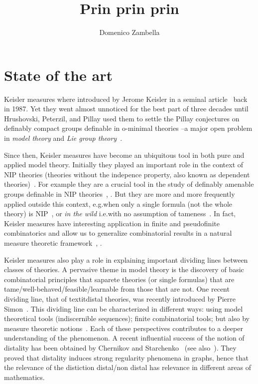\documentclass[10pt]{article}
\title{Prin prin prin}
\author{Domenico Zambella}
\begin{document}
\maketitle
\section{State of the art}
Keisler measures where introduced by Jerome Keisler in a seminal article~\cite{MR890599} back in 1987.
Yet they went almost unnoticed for the best part of three decades until Hrushovski, Peterzil, and Pillay used them to settle the Pillay conjectures on definably compact groups definable in o-minimal theories --a major open problem in \textit{model theory\/} and \textit{Lie group theory\/}~\cite{MR2373360}.

Since then, Keisler measures have become an ubiquitous tool in both pure and applied model theory.
Initially they played an important role in the context of NIP theories (theories without the indepence property, also known as dependent theories)~\cite{MR3560428}.
For example they are a crucial tool in the study of definably amenable groups definable in NIP theories~\cite{MR3787403}, \cite{MR2427062}.
But they are more and more frequently applied outside this context, e.g.\@ when only a single formula (not the whole theory) is NIP~\cite{MR4010500}, \cite{arXiv:2103.09946} or \textit{in the wild\/} i.e.\@ with no assumption of tameness~\cite{arXiv:2103.09946}.
In fact, Keisler measures have interesting application in finite and pseudofinite combinatorics and allow us to generalize combinatorial results in a natural measure theoretic framework~\cite{MR4222408}, \cite{MR3666030}.

Keisler measures also play a role in explaining important dividing lines between classes of theories.
A pervasive theme in model theory is the discovery of basic combinatorial principles that saparete theories (or single formulas) that are tame/well-behaved/feasible/learnable from those that are not.
One recent dividing line, that of textit{distal theories}, was recently introduced by Pierre Simon~\cite{MR3001548}.
This dividing line can be characterized in different ways: using model theoretical tools (indiscernible sequences); finite combinatorial tools; but also by measure theoretic notions~\cite{MR3335415}.
Each of these perspectives contributes to a deeper understanding of the phenomenon.
A recent influential success of the notion of distality has been obtained by Chernikov and Starchenko~\cite{MR3852184} (see also~\cite{MR3503725}).
They proved that distality induces strong regularity phenomena in graphs, hence that the relevance of the distiction distal/non distal has relevance in different areas of mathematics.
\end{document}

